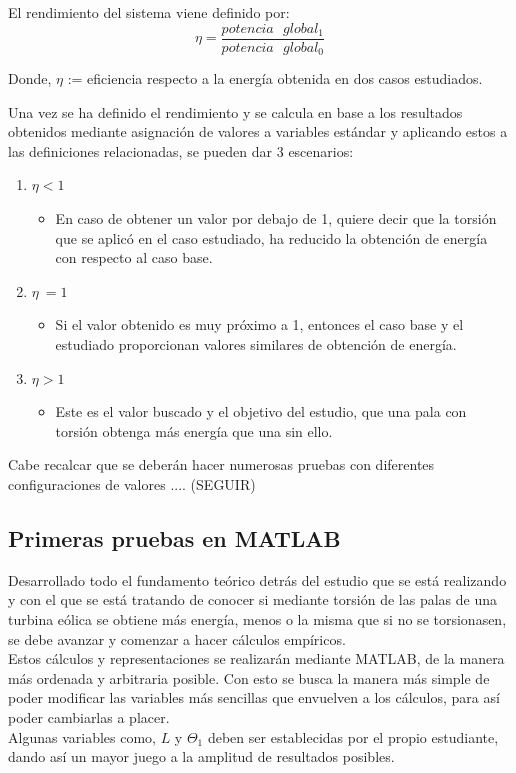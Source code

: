    \begin{definicion}
El rendimiento del sistema viene definido por:
 $$ \eta = \dfrac{potencia \text{ } global_1}{potencia \text{ } global_0} $$ 
 
 Donde,
  \centering $\eta$ := eficiencia respecto a la energía obtenida en dos casos estudiados.
 \label{def:rendimiento_potencias}
 \end{definicion}
 
 Una vez se ha definido el rendimiento y se calcula en base a los resultados obtenidos mediante asignación de valores a variables estándar y aplicando estos a las definiciones relacionadas, se pueden dar 3 escenarios:
 

\begin{enumerate}
    \item $\eta < 1$
        \begin{itemize}
            \item En caso de obtener un valor por debajo de 1, quiere decir que la torsión que se aplicó en el caso estudiado, ha reducido la obtención de energía con respecto al caso base. 
        \end{itemize}
    \item $\eta ~= 1$
        \begin{itemize}
            \item Si el valor obtenido es muy próximo a 1, entonces el caso base y el estudiado proporcionan valores similares de obtención de energía.
        \end{itemize}
    \item $\eta > 1$
        \begin{itemize}
            \item Este es el valor buscado y el objetivo del estudio, que una pala con torsión obtenga más energía que una sin ello.
        \end{itemize}
\end{enumerate}

Cabe recalcar que se deberán hacer numerosas pruebas con diferentes configuraciones de valores .... (SEGUIR)
 
\subsection{Primeras pruebas en MATLAB}

Desarrollado todo el fundamento teórico detrás del estudio que se está realizando y con el que se está tratando de conocer si mediante torsión de las palas de una turbina eólica se obtiene más energía, menos o la misma que si no se torsionasen, se debe avanzar y comenzar a hacer cálculos empíricos. \\

Estos cálculos y representaciones se realizarán mediante MATLAB, de la manera más ordenada y arbitraria posible. Con esto se busca la manera más simple de poder modificar las variables más sencillas que envuelven a los cálculos, para así poder cambiarlas a placer. \\

Algunas variables como, $L$ y $\Theta_1$ deben ser establecidas por el propio estudiante, dando así un mayor juego a la amplitud de resultados posibles. \\